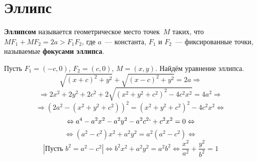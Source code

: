 \section{Эллипс}
\begin{wrapfigure}{r}{0pt}\noindent
{}
\end{wrapfigure}

 \textbf{Эллипсом} называется геометрическое место точек~$M$ таких, что $MF_1 + MF_2 = 2a > F_1 F_2$, где $a$~--- константа, $F_1$ и $F_2$~--- фиксированные точки, называемые \textbf{фокусами эллипса}.

Пусть $F_1 = (-c, 0)$, $F_2 = (c, 0)$, $M = (x, y)$.
Найдём уравнение эллипса.
\begin{equation*}
\sqrt{(x + c)^2 + y^2} + \sqrt{(x - c)^2 + y^2} = 2a \Rightarrow
\end{equation*}
\begin{equation*}
\Rightarrow 2x^2 + 2y^2 + 2c^2 + 2\sqrt{(x^2 + y^2 + c^2)^2 - 4c^2 x^2} = 4a^2 \Rightarrow
\end{equation*}
\begin{equation*}
\Rightarrow (2a^2 - (x^2 + y^2 + c^2))^2 = (x^2 + y^2 + c^2)^2 - 4c^2 x^2 \Leftrightarrow
\end{equation*}
\begin{equation*}
\Leftrightarrow a^4 - a^2 x^2 - a^2 y^2 - a^2 c^2`+ c^2 x^2 = 0 \Leftrightarrow
\end{equation*}
\begin{equation*}
\Leftrightarrow (a^2 - c^2) x^2 + a^2 y^2 = a^2 (a^2 - c^2) \Leftrightarrow
\end{equation*}
\begin{equation*}
\left|\text{Пусть $b^2 = a^2 - c^2$}\right|
\Leftrightarrow b^2 x^2 + a^2 y^2 = a^2 b^2 \Leftrightarrow
\frac{x^2}{a^2} + \frac{y^2}{b^2} = 1
\end{equation*}


